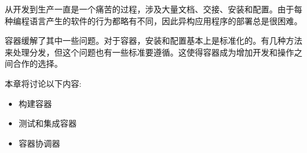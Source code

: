 
从开发到生产一直是一个痛苦的过程，涉及大量文档、交接、安装和配置。由于每种编程语言产生的软件的行为都略有不同，因此异构应用程序的部署总是很困难。

容器缓解了其中一些问题。对于容器，安装和配置基本上是标准化的。有几种方法来处理分发，但这个问题也有一些标准要遵循。这使得容器成为增加开发和操作之间合作的选择。

本章将讨论以下内容:

\begin{itemize}
\item 
构建容器

\item 
测试和集成容器

\item 
容器协调器
\end{itemize}
